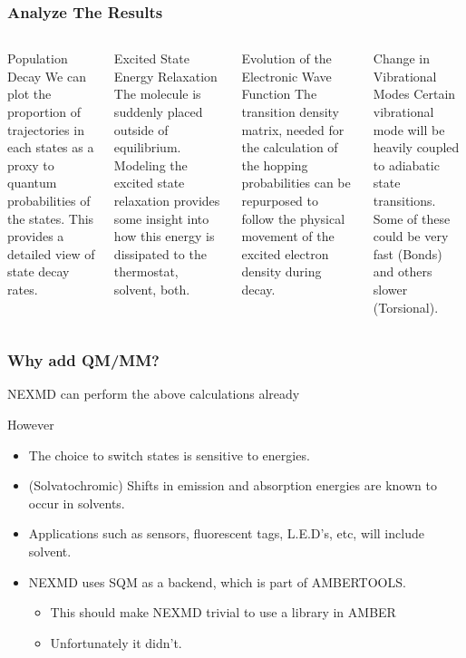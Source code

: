 \documentclass{beamer}
\begin{document}
\begin{frame}
  \frametitle{Analyze The Results}
 \begin{columns}[c]
\begin{block}{Population Decay}
We can plot the proportion of trajectories in each states as a proxy to quantum
probabilities of the states. This provides a detailed view of state decay rates. 
\end{block}
\begin{block}{Excited State Energy Relaxation}
The molecule is suddenly placed outside of equilibrium. Modeling the excited
state relaxation provides some insight into how this energy is dissipated to the
thermostat, solvent, both.
\end{block}
\begin{block}{Evolution of the Electronic Wave Function}
The transition density matrix, needed for the calculation of the hopping
probabilities can be repurposed to follow the physical movement of the excited electron density during decay.
\end{block}
\begin{block}{Change in Vibrational Modes}
  Certain vibrational mode will be heavily coupled to adiabatic state
  transitions. Some of these could be very fast (Bonds) and others slower (Torsional).
\end{block}

 \end{columns} 
\end{frame}

\begin{frame}
  \frametitle{Why add QM/MM?}
  NEXMD can perform the above calculations already
\begin{block}{However}
  \begin{itemize}
    \item The choice to switch states is sensitive to energies.
    \item (Solvatochromic) Shifts in emission and absorption energies are known to
    occur in solvents.
    \item Applications such as sensors, fluorescent tags, L.E.D's, etc, will include solvent.
    \item NEXMD uses SQM as a backend, which is part of AMBERTOOLS.
    \begin{itemize}
      \item This should make NEXMD trivial to use a library in AMBER
      \item Unfortunately it didn't.
    \end{itemize}
  \end{itemize}
\end{block}
\end{frame}
\end{document}
